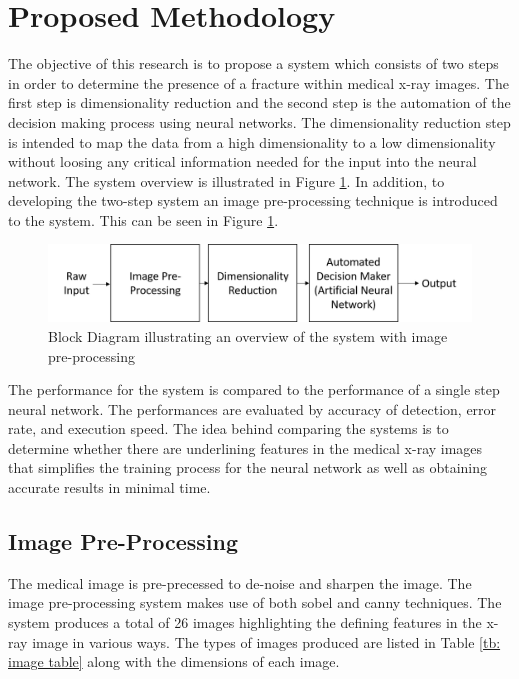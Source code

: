 \documentclass[11pt,twocolumn]{witseiepaper}
\begin{document}
	\section{Proposed Methodology}
	The objective of this research is to propose a system which consists of two steps in order to determine the presence of a fracture within medical x-ray images. The first step is dimensionality reduction and the second step is the automation of the decision making process using neural networks. The dimensionality reduction step is intended to map the data from a high dimensionality to a low dimensionality without loosing any critical information needed for the input into the neural network. The system overview is illustrated in Figure \ref{fig:system overview_2}.
	\newline
	In addition, to developing the two-step system an image pre-processing technique is introduced to the system. This can be seen in Figure \ref{fig:system overview_2}.
	\begin{figure}[!h]
		\centering
		\includegraphics[scale=0.23]{system_overview_2.png}
		\caption{Block Diagram illustrating an overview of the system with image pre-processing }
		\label{fig:system overview_2}
	\end{figure}
	\newline
	The performance for the system is compared to the performance of a single step neural network. The performances are evaluated by accuracy of detection, error rate, and execution speed. The idea behind comparing the systems is to determine whether there are underlining features in the medical x-ray images that simplifies the training process for the neural network as well as obtaining accurate results in minimal time.
	
	\subsection{Image Pre-Processing}
	The medical image is pre-precessed to de-noise and sharpen the image. The image pre-processing system makes use of both sobel and canny techniques. The system produces a total of 26 images highlighting the defining features in the x-ray image in various ways. The types of images produced are listed in Table \ref{tb: image table} along with the dimensions of each image.
	
\end{document}
